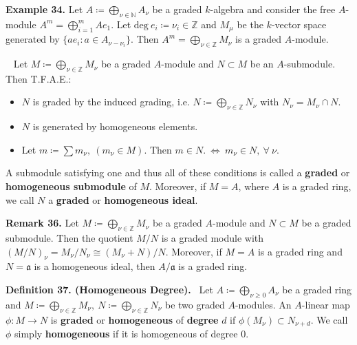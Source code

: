 \documentclass[12pt,a4paper,footinclude=true,headinclude=true]{scrbook} %
\newenvironment{lemma}[2][]
{\renewcommand\theinnercustomlemma{#2}\innercustomlemma[#1]
\begin{mdframed}[backgroundcolor=gray!20]\ }
{\end{mdframed}\endinnercustomprop}
\newenvironment{definition}[2][Definition]
    { \begin{mdframed}[backgroundcolor=gray!20] \textbf{#1 #2.}\ }
    {  \end{mdframed}}
\newenvironment{remark}[2][Remark]
    { \begin{mdframed}[backgroundcolor=gray!20] \textbf{#1 #2.} }
    {  \end{mdframed}}
\newenvironment{example}[2][Example]
    { \begin{mdframed}[backgroundcolor=gray!20] \textbf{#1 #2.} }
    {  \end{mdframed}}
\begin{document}
\begin{example}{34}
    Let $A\coloneqq\bigoplus_{\nu\in\mathbb{N}}A_\nu$ be a graded $k$-algebra and consider the free $A$-module $A^m=\bigoplus_{i=1}^m Ae_1$. Let $\mathrm{deg}\ e_i \coloneqq\nu_i\in\mathbb{Z}$ and $M_\mu$ be the $k$-vector space generated by $\{ae_i:a\in A_{\nu-\nu_i}\}$. Then $A^m=\bigoplus_{\nu\in\mathbb{Z}}M_\nu$ is a graded $A$-module.
\end{example}

\begin{lemma}{35. (Graded Submodules)}
    Let $M\coloneqq\bigoplus_{\nu\in\mathbb{Z}}M_\nu$ be a graded $A$-module and $N\subset M$ be an $A$-submodule. Then T.F.A.E.:
    \begin{itemize}
        \item[(a)] $N$ is graded by the induced grading, i.e. $N\coloneqq\bigoplus_{\nu\in\mathbb{Z}}N_\nu$ with $N_\nu=M_\nu\cap N$.
        \item[(b)] $N$ is generated by homogeneous elements.
        \item[(c)] Let $m\coloneqq\sum m_\nu,\ (m_\nu\in M)$. Then $m\in N.\ \Leftrightarrow\ m_\nu\in N,\ \forall\ \nu$. 
    \end{itemize}
    A submodule satisfying one and thus all of these conditions is called a \textbf{graded} or \textbf{homogeneous submodule} of $M$. Moreover, if $M=A$, where $A$ is a graded ring, we call $N$ a \textbf{graded} or \textbf{homogeneous ideal}.
\end{lemma}

\begin{remark}{36}
    Let $M\coloneqq\bigoplus_{\nu\in\mathbb{Z}}M_\nu$ be a graded $A$-module and $N\subset M$ be a graded submodule. Then the quotient $M/N$ is a graded module with $(M/N)_\nu=M_\nu/N_\nu\cong(M_\nu+N)/N$. Moreover, if $M=A$ is a graded ring and $N=\mathfrak{a}$ is a homogeneous ideal, then $A/\mathfrak{a}$ is a graded ring.
\end{remark}

\begin{definition}{37. (Homogeneous Degree)}
    Let $A\coloneqq\bigoplus_{\nu\geq0}A_\nu$ be a graded ring and $M\coloneqq\bigoplus_{\nu\in\mathbb{Z}}M_\nu,\ N\coloneqq \bigoplus_{\nu\in\mathbb{Z}}N_\nu$ be two graded $A$-modules. An $A$-linear map\\ $\phi:M\to N$ is \textbf{graded} or \textbf{homogeneous} of \textbf{degree} $d$ if $\phi(M_\nu)\subset N_{\nu+d}$. We call $\phi$ simply \textbf{homogeneous} if it is homogeneous of degree $0$.
\end{definition}
\end{document}
